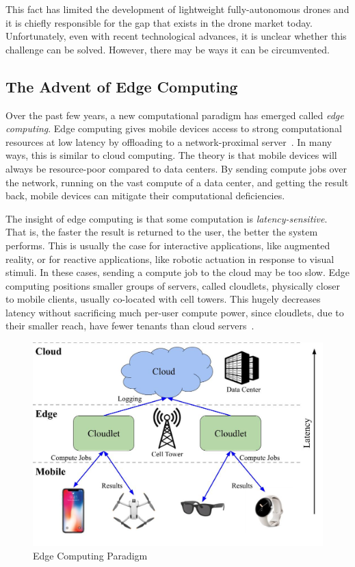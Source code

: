 This fact has limited the development of lightweight fully-autonomous drones and it is chiefly responsible for the gap that exists in the drone market today. Unfortunately, even with recent technological advances, it is unclear whether this challenge can be solved. However, there may be ways it can be circumvented.

\subsection{The Advent of Edge Computing}
Over the past few years, a new computational paradigm has emerged called \textit{edge computing}. Edge computing gives mobile devices access to strong computational resources at low latency by offloading to a network-proximal server~\cite{Satya2017}. In many ways, this is similar to cloud computing. The theory is that mobile devices will always be resource-poor compared to data centers. By sending compute jobs over the network, running on the vast compute of a data center, and getting the result back, mobile devices can mitigate their computational deficiencies. 

The insight of edge computing is that some computation is \textit{latency-sensitive}. That is, the faster the result is returned to the user, the better the system performs. This is usually the case for interactive applications, like augmented reality, or for reactive applications, like robotic actuation in response to visual stimuli. In these cases, sending a compute job to the cloud may be too slow. Edge computing positions smaller groups of servers, called cloudlets, physically closer to mobile clients, usually co-located with cell towers. This hugely decreases latency without sacrificing much per-user compute power, since cloudlets, due to their smaller reach, have fewer tenants than cloud servers~\cite{Charyyev2020,Dolui2017}.

\begin{figure}
    \centering
    \includegraphics[width=0.9\linewidth]{chapter2/FIGS/edge-computing.jpg}
    \caption{Edge Computing Paradigm}
    \label{fig:edge-computing}
\end{figure}

